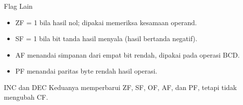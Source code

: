 \documentclass[aspectratio=169,11pt]{beamer}
\begin{document}
\begin{frame}{Flag Lain}
\small
\begin{itemize}
    \item ZF = 1 bila hasil nol; dipakai memeriksa kesamaan operand.

    \vspace{0.18em}
    \item SF = 1 bila bit tanda hasil menyala (hasil bertanda
          negatif).

    \vspace{0.18em}
    \item AF menandai simpanan dari empat bit rendah, dipakai pada
          operasi BCD.

    \vspace{0.18em}
    \item PF menandai paritas byte rendah hasil operasi.
\end{itemize}

\vspace{0.25em}
\begin{alertblock}{INC dan DEC}
\small Keduanya memperbarui ZF, SF, OF, AF, dan PF, tetapi tidak
mengubah CF.
\end{alertblock}
\end{frame}
\end{document}
